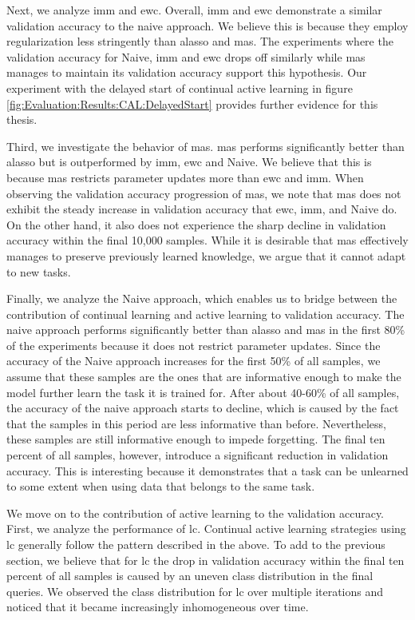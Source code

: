 Next, we analyze \gls{imm} and \gls{ewc}. Overall, \gls{imm} and \gls{ewc} demonstrate a similar validation accuracy to the naive approach. We believe this is
because they employ regularization less stringently than \gls{alasso} and \gls{mas}. The experiments where the validation accuracy for Naive, \gls{imm} and \gls{ewc}
drops off similarly while \gls{mas} manages to maintain its validation accuracy support this hypothesis. Our experiment with the delayed start of continual active
learning in figure \ref{fig:Evaluation:Results:CAL:DelayedStart} provides further evidence for this thesis. \par
Third, we investigate the behavior of \gls{mas}. \gls{mas} performs significantly better than \gls{alasso} but is outperformed by \gls{imm}, \gls{ewc} and Naive.
We believe that this is because \gls{mas} restricts parameter updates more than \gls{ewc} and \gls{imm}. When observing the validation accuracy progression of
\gls{mas}, we note that \gls{mas} does not exhibit the steady increase in validation accuracy that \gls{ewc}, \gls{imm}, and Naive do. On the other hand,
it also does not experience the sharp decline in validation accuracy within the final 10,000 samples. While it is desirable that \gls{mas} effectively manages
to preserve previously learned knowledge, we argue that it cannot adapt to new tasks. \par

Finally, we analyze the Naive approach, which enables us to bridge between the contribution of continual learning and active learning to validation accuracy.
The naive approach performs significantly better than \gls{alasso} and \gls{mas} in the first 80\% of the experiments because it does not restrict parameter updates. 
Since the accuracy of the Naive approach increases for the first 50\% of all samples, we assume that these samples are the ones that are informative enough
to make the model further learn the task it is trained for. After about 40-60\% of all samples, the accuracy of the naive approach starts to decline, which is caused
by the fact that the samples in this period are less informative than before. Nevertheless, these samples are still informative enough to impede forgetting. 
The final ten percent of all samples, however, introduce a significant reduction in validation accuracy. This is interesting because it demonstrates that a task can be
unlearned to some extent when using data that belongs to the same task. \par
We move on to the  contribution of active learning to the validation accuracy. First, we analyze the performance of \gls{lc}. Continual active learning strategies
using \gls{lc} generally follow the pattern described in the above. To add to the previous section, we believe that for \gls{lc} the drop in
validation accuracy within the final ten percent of all samples is caused by an uneven class distribution in the final queries. We observed the class distribution
for \gls{lc} over multiple iterations and noticed that it became increasingly inhomogeneous over time. \par


